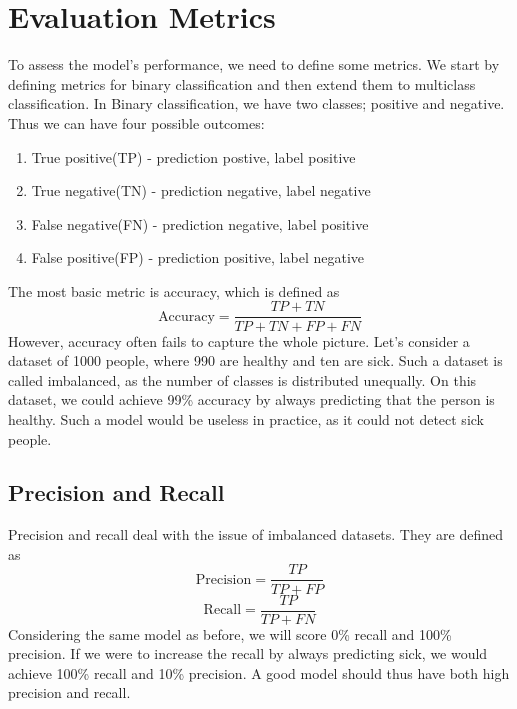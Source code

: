 \section{Evaluation Metrics}
\label{sec:metrics}
To assess the model's performance, we need to define some metrics.
We start by defining metrics for binary classification and then extend them to multiclass classification.
In Binary classification, we have two classes; positive and negative. Thus we can have four possible outcomes:
\begin{enumerate}
    \item True positive(TP) - prediction postive, label positive
    \item True negative(TN) - prediction negative, label negative
    \item False negative(FN) - prediction negative, label positive
    \item False positive(FP) - prediction positive, label negative
\end{enumerate}

The most basic metric is accuracy, which is defined as
\begin{equation}
    \label{eq:accuracy}
    \text{Accuracy} = \frac{TP + TN}{TP + TN + FP + FN}
\end{equation}
However, accuracy often fails to capture the whole picture.
Let's consider a dataset of 1000 people, where 990 are healthy and ten are sick.
Such a dataset is called imbalanced, as the number of classes is distributed unequally.
On this dataset, we could achieve 99\% accuracy by always predicting that the person is healthy.
Such a model would be useless in practice, as it could not detect sick people.

\subsection{Precision and Recall}
Precision and recall deal with the issue of imbalanced datasets.
They are defined as
\begin{equation}
    \label{eq:precision}
    \text{Precision} = \frac{TP}{TP + FP}
\end{equation}
\begin{equation}
    \label{eq:recall}
    \text{Recall} = \frac{TP}{TP + FN}
\end{equation}
Considering the same model as before, we will score 0\% recall and 100\% precision.
If we were to increase the recall by always predicting sick, we would achieve 100\% recall and 10\% precision.
A good model should thus have both high precision and recall.

